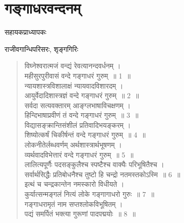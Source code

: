 {\fontsize{16}{18}\selectfont
\presetvalues
\chapter{गङ्गाधरवन्दनम्}


\centerline{}

\centerline{सहायकप्राध्यापकः}

\centerline{राजीवगान्धिपरिसरः, शृङ्गगिरिः}

\centerline{\addrule}

\begin{verse}
विघ्नेश्वरात्मजं वन्द्यं  रेवत्यानन्दवर्धनम् ।\\
महीसुरपुरीवासं वन्दे गङ्गाधरं गुरुम्~॥ 1~॥\\
न्यायशास्त्रविशालाक्षं न्यायवादविशारदम् ।\\
आयुर्वेदादिशास्त्रज्ञं वन्दे गङ्गाधरं गुरुम्~॥ 2~॥\\
सर्वदा सत्यवक्तारम् आङ्ग्लभाषाविचक्षणम् ।\\
हिन्दिभाषाप्रवीणं तं वन्दे गङ्गाधरं गुरुम्~॥ 3~॥\\
विद्यासङ्क्रान्तिसंशीलं प्रतिवादिभयङ्करम् ।\\
शिष्योत्कर्षं चिकीर्षन्तं वन्दे गङ्गाधरं गुरुम्~॥ 4~॥\\
लोकनीतेर्लब्धवर्णम् अर्थशास्त्रार्थभूषणम् ।\\
व्यर्थवादविभेत्तारं वन्दे गङ्गाधरं गुरुम्~॥ 5~॥\\
लालित्यपूर्णैः पदसङ्कुलैश्च स्पष्टैश्च वाक्यैः परिभूषितैश्च ।\\
सर्वार्थसिद्धैः प्रतिबोधनैश्च तुष्टो हि चन्द्रो नतमस्तकोऽस्मि~॥ 6~॥\\
इत्थं च चन्द्रकान्तेन नमस्कारो विधीयते ।\\
कुर्यात्सन्मङ्गलं नित्यं लोके गङ्गागाधरो गुरुः~॥ 7~॥\\
गङ्गाधरामृतं नाम सप्तश्लोकविभूषितम्  ।\\
पद्यं समर्पितं भक्त्या गुरूणां पादपद्मयोः~॥ 8~॥
\end{verse}

\centerline{{\fontsize{10}{12}\selectfont{}\quad{}\quad{}}}
}
